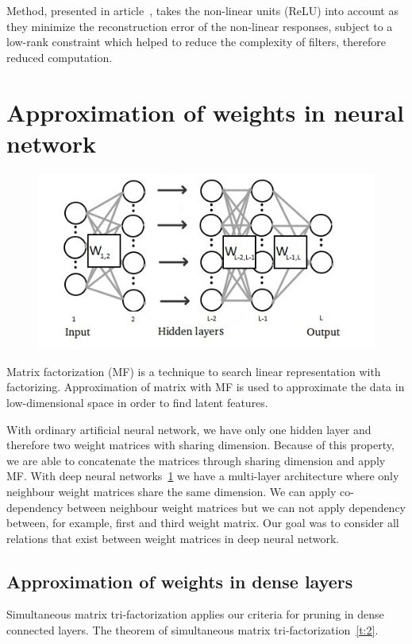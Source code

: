 \documentclass{article} %
\begin{document}
Method, presented in article~\cite{zhang2015efficient}, takes the non-linear 
units (ReLU) into account as they minimize the reconstruction error of the 
non-linear responses, subject to a low-rank constraint which helped to reduce the 
complexity of filters, therefore reduced computation. 

\section{Approximation of weights in neural network}
\begin{figure}[!ht]
\centering
\includegraphics[width=.65\linewidth]{globokamreza2.jpg}
\label{f:globokamreza}
\end{figure}


Matrix factorization (MF) is a technique to search linear representation with
factorizing. Approximation of matrix with MF is used to
approximate the data in low-dimensional space in order to find latent features.

With ordinary artificial neural network, we have only one hidden layer and
therefore two weight matrices with sharing dimension. Because of this property,
we are able to concatenate the matrices through sharing dimension and apply MF.
With deep neural networks~\ref{f:globokamreza} we have a 
multi-layer architecture where only
neighbour weight matrices share the same dimension. We can apply co-dependency
between neighbour weight matrices but we can not apply dependency between, for
example, first and third weight matrix. Our goal was to consider all relations
that exist between weight matrices in deep neural network. 

\subsection{Approximation of weights in dense layers}
Simultaneous matrix
tri-factorization applies our criteria for pruning in dense connected layers. 
The theorem of simultaneous matrix tri-factorization~\ref{t:2}. 
\end{document}
